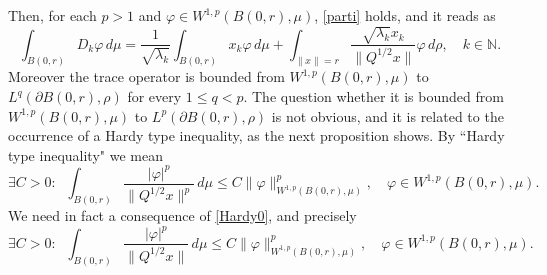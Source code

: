 \documentclass[reqno,twoside,12pt]{amsart}
\begin{document}
Then, for each $p>1$ and  $\varphi\in W^{1,p}(B(0,r), \mu)$, \eqref{parti} holds, and it  reads as 
$$\int_{B(0,r)} D_k\varphi \,d\mu =  \frac{1}{\sqrt{\lambda_k} }  \int_{B(0,r)} x_k\varphi \,d\mu +   \int_{\|x\| = r} \frac{\sqrt{\lambda_k} x_k}{\|Q^{1/2}x\| }\varphi \,d\rho , \quad k\in {\mathbb N} .$$
Moreover  the trace operator is bounded from $W^{1,p}(B(0,r), \mu)$ to $L^{q}(\partial B(0,r), \rho)$ for every $1\leq q <p$. 
The question whether it is bounded from $W^{1,p}(B(0,r), \mu)$ to $L^{p}(\partial B(0,r), \rho)$ is not obvious, and it is related to the occurrence of a Hardy type inequality, as the next proposition shows. By ``Hardy type inequality" we mean
\begin{equation}
\label{Hardy0}\exists C>0:\;\;\int_{B(0,r)}\frac{|\varphi|^p}{\|Q^{1/2}x\|^p}\,d\mu \leq C\|\varphi\|_{W^{1,p}(B(0,r), \mu)}^p, \quad \varphi \in W^{1,p}(B(0,r), \mu).
\end{equation}
We need in fact a consequence of \eqref{Hardy0}, and precisely
\begin{equation}
\label{Hardy}
\exists C>0:\;\;\int_{B(0,r)}\frac{|\varphi|^p}{\|Q^{1/2}x\|}\,d\mu \leq C\|\varphi\|_{W^{1,p}(B(0,r), \mu)}^p, \quad \varphi \in W^{1,p}(B(0,r), \mu).
\end{equation}
\end{document}
